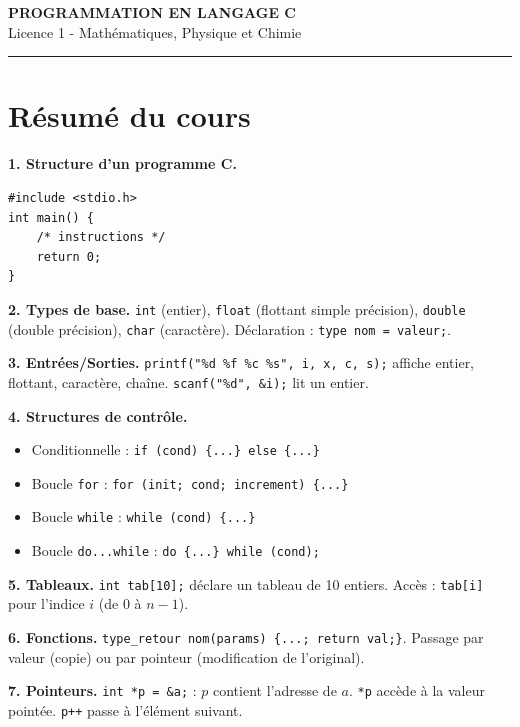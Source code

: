 \documentclass[12pt,a4paper]{article}
\begin{document}
\fi

\begin{center}
  {\LARGE\bfseries PROGRAMMATION EN LANGAGE C}\\[0.3cm]
  {\normalsize Licence 1 - Mathématiques, Physique et Chimie}\\[0.1cm]
  \rule{0.7\textwidth}{0.8pt}
\end{center}

\section*{Résumé du cours}

\begin{boiteresume}

\textbf{1. Structure d'un programme C.}
\begin{lstlisting}
#include <stdio.h>
int main() {
    /* instructions */
    return 0;
}
\end{lstlisting}

\textbf{2. Types de base.} \texttt{int} (entier), \texttt{float} (flottant simple précision), \texttt{double} (double précision), \texttt{char} (caractère). Déclaration : \texttt{type nom = valeur;}.

\textbf{3. Entrées/Sorties.} \texttt{printf("\%d \%f \%c \%s", i, x, c, s);} affiche entier, flottant, caractère, chaîne. \texttt{scanf("\%d", \&i);} lit un entier.

\textbf{4. Structures de contrôle.}
\begin{itemize}[nosep]
  \item Conditionnelle : \texttt{if (cond) \{...\} else \{...\}}
  \item Boucle \texttt{for} : \texttt{for (init; cond; increment) \{...\}}
  \item Boucle \texttt{while} : \texttt{while (cond) \{...\}}
  \item Boucle \texttt{do...while} : \texttt{do \{...\} while (cond);}
\end{itemize}

\textbf{5. Tableaux.} \texttt{int tab[10];} déclare un tableau de 10 entiers. Accès : \texttt{tab[i]} pour l'indice $i$ (de 0 à $n-1$).

\textbf{6. Fonctions.} \texttt{type\_retour nom(params) \{...; return val;\}}. Passage par valeur (copie) ou par pointeur (modification de l'original).

\textbf{7. Pointeurs.} \texttt{int *p = \&a;} : $p$ contient l'adresse de $a$. \texttt{*p} accède à la valeur pointée. \texttt{p++} passe à l'élément suivant.

\end{boiteresume}
\end{document}
